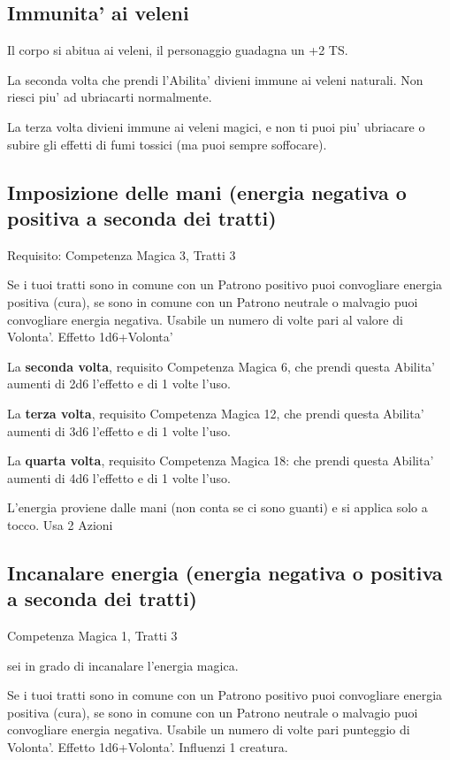 \documentclass[a4paper,11pt,twoside,openany]{book}
\begin{document}
	\subsection{Immunita' ai veleni}
	
	Il corpo si abitua ai veleni, il personaggio guadagna un +2 TS.
	
	La seconda volta che prendi l'Abilita' divieni immune ai veleni naturali.
	Non riesci piu' ad ubriacarti normalmente.
	
	La terza volta divieni immune ai veleni magici, e non ti puoi piu' ubriacare o subire gli effetti di fumi tossici (ma puoi sempre soffocare).
	
	\subsection{Imposizione delle mani (energia negativa o positiva a seconda dei tratti)}
	
	Requisito: Competenza Magica 3, Tratti 3
	
	Se i tuoi tratti sono in comune con un Patrono positivo puoi convogliare energia positiva (cura), se sono in comune con un Patrono neutrale o malvagio puoi convogliare energia negativa. Usabile un numero di volte pari al valore di Volonta'. Effetto 1d6+Volonta'
	
	La \textbf{seconda volta}, requisito Competenza Magica 6, che prendi questa Abilita' aumenti di 2d6 l'effetto e di 1 volte l'uso.
	
	La \textbf{terza volta}, requisito Competenza Magica 12, che prendi questa Abilita' aumenti di 3d6 l'effetto e di 1 volte l'uso.
	
	La \textbf{quarta volta}, requisito Competenza Magica 18: che prendi questa Abilita' aumenti di 4d6 l'effetto e di 1 volte l'uso.
	
	L'energia proviene dalle mani (non conta se ci sono guanti) e si applica solo a tocco. Usa 2 Azioni
	
	\subsection{Incanalare energia (energia negativa o positiva a seconda dei tratti)}
	
	Competenza Magica 1, Tratti 3
	
	sei in grado di incanalare l'energia magica.
	
	Se i tuoi tratti sono in comune con un Patrono positivo puoi convogliare energia positiva (cura), se sono in comune con un Patrono neutrale o malvagio puoi convogliare energia negativa. Usabile un numero di volte pari punteggio di Volonta'. Effetto 1d6+Volonta'. Influenzi 1 creatura.
	
\end{document}
